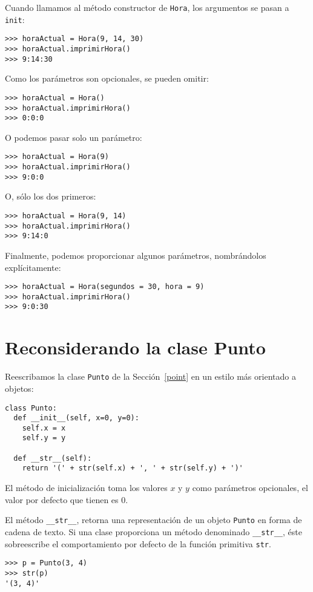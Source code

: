 
Cuando llamamos al método constructor de \texttt{Hora}, los argumentos
se pasan a \texttt{init}:
\begin{verbatim}
>>> horaActual = Hora(9, 14, 30)
>>> horaActual.imprimirHora()
>>> 9:14:30
\end{verbatim}

Como los parámetros son opcionales, se pueden omitir:
\begin{verbatim}
>>> horaActual = Hora()
>>> horaActual.imprimirHora()
>>> 0:0:0
\end{verbatim}

O podemos pasar solo un parámetro:
\begin{verbatim}
>>> horaActual = Hora(9)
>>> horaActual.imprimirHora()
>>> 9:0:0
\end{verbatim}

O, sólo los dos primeros:
\begin{verbatim}
>>> horaActual = Hora(9, 14)
>>> horaActual.imprimirHora()
>>> 9:14:0
\end{verbatim}

Finalmente, podemos proporcionar algunos parámetros, nombrándolos
explícitamente:
\begin{verbatim}
>>> horaActual = Hora(segundos = 30, hora = 9)
>>> horaActual.imprimirHora()
>>> 9:0:30
\end{verbatim}

\section{Reconsiderando la clase Punto}

 

Reescribamos la clase \texttt{Punto} de la Sección~\ref{point} en
un estilo más orientado a objetos:
\begin{verbatim}
class Punto:
  def __init__(self, x=0, y=0):
    self.x = x
    self.y = y

  def __str__(self):
    return '(' + str(self.x) + ', ' + str(self.y) + ')'
\end{verbatim}

El método de inicialización toma los valores $x$ y $y$ como parámetros
opcionales, el valor por defecto que tienen es 0.

El método \texttt{\_\_str\_\_}, retorna una representación de un objeto
\texttt{Punto} en forma de cadena de texto. Si una clase proporciona
un método denominado \texttt{\_\_str\_\_}, éste sobreescribe el comportamiento
por defecto de la función primitiva \texttt{str}.
\begin{verbatim}
>>> p = Punto(3, 4)
>>> str(p)
'(3, 4)'
\end{verbatim}

